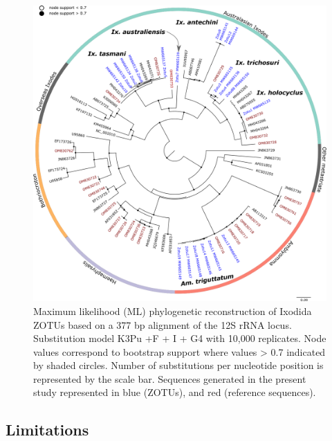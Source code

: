 \documentclass[a4paper, nobind]{templates/ociamthesis}
\begin{document}
\begin{figure}
\includegraphics[width=0.95\linewidth]{figures/ms-figs/Ch2-12SNGStree} \caption[Phylogeny of tick species from wildlife.]{Maximum likelihood (ML) phylogenetic reconstruction of Ixodida ZOTUs based on a 377 bp alignment of the 12S rRNA locus. Substitution model K3Pu +F + I + G4 with 10,000 replicates. Node values correspond to bootstrap support where values > 0.7 indicated by shaded circles. Number of substitutions per nucleotide position is represented by the scale bar. Sequences generated in the present study represented in blue (ZOTUs), and red (reference sequences).}\label{fig:F2NGStree}
\end{figure}

\hypertarget{limitations}{%
\subsection{Limitations}\label{limitations}}
\end{document}
